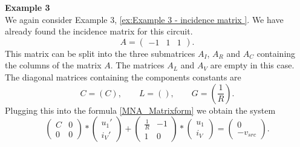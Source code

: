 \textbf{Example 3} \label{ex:Example 3 - MNA} \\
We again consider Example 3, \ref{ex:Example 3 - incidence matrix }. We have already found the incidence matrix for this circuit.
\begin{displaymath}
	A = 
	\left(
	\begin{matrix}
		-1 & 1 & 1
	\end{matrix}
	\right).
\end{displaymath} 
This matrix can be split into the three submatrices $A_I$, $A_R$ and $A_C$ containing the columns of the matrix $A$. The matrices $A_L$ and $A_V$ are empty in this case. The diagonal matrices containing the components constants are
\begin{displaymath}
	C = (C), \qquad L = (), \qquad G = (\frac{1}{R}).
\end{displaymath}
Plugging this into the formula \eqref{MNA_Matrixform} we obtain the system
\begin{displaymath}
	\begin{pmatrix}
		C & 0 \\
		0 & 0 
	\end{pmatrix}
	*
	\begin{pmatrix}
		u_1' \\
		i_V'
	\end{pmatrix}
	+
	\begin{pmatrix}
		\frac{1}{R} & -1 \\
		1 & 0
	\end{pmatrix}
	*
	\begin{pmatrix}
		u_1 \\
		i_V
	\end{pmatrix}
	=
	\begin{pmatrix}
		0 \\
		-v_{src}
	\end{pmatrix}.
\end{displaymath}



